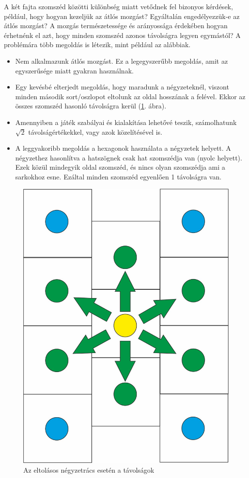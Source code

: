 A két fajta szomszéd közötti különbség miatt vetődnek fel bizonyos kérdések, például, hogy hogyan kezeljük az átlós mozgást? Egyáltalán engedélyezzük-e az átlós mozgást? A mozgás természetessége és arányossága érdekében hogyan érhetnénk el azt, hogy minden szomszéd azonos távolságra legyen egymástól?
\newpage
A problémára több megoldás is létezik, mint például az alábbiak.
\begin{itemize}
\item Nem alkalmazunk átlós mozgást. Ez a legegyszerűbb megoldás, amit az egyszerűsége miatt gyakran használnak.
\item Egy kevésbé elterjedt megoldás, hogy maradunk a négyzeteknél, viszont minden második sort/oszlopot eltolunk az oldal hosszának a felével. Ekkor az összes szomszéd hasonló távolságra kerül (\ref{fig:SqOffsetDistance}. ábra).
\item Amennyiben a játék szabályai és kialakítása lehetővé teszik, számolhatunk $\sqrt{2}$ távolságértékekkel, vagy azok közelítésével is.
\item A leggyakoribb megoldás a hexagonok használata a négyzetek helyett. A négyzethez hasonlítva a hatszögnek csak hat szomszédja van (nyolc helyett). Ezek közül mindegyik oldal szomszéd, és nincs olyan szomszédja ami a sarkokhoz esne. Ezáltal minden szomszéd egyenlően 1 távolságra van.
\end{itemize}

\begin{figure}[h!]
\centering
\includegraphics[scale=0.3]{kepek/SqOffsetDistance.jpg}
\caption{Az eltolásos négyzetrács esetén a távolságok}
\label{fig:SqOffsetDistance}
\end{figure}

